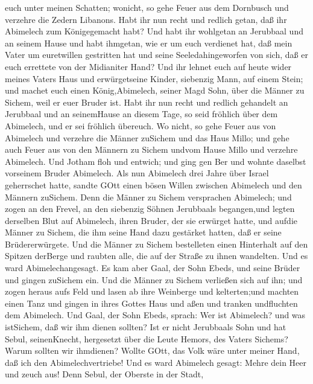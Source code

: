 euch unter meinen Schatten; wonicht, so gehe Feuer aus dem Dornbusch und
verzehre die Zedern Libanons.  Habt ihr nun recht und
redlich getan, daß ihr Abimelech zum Königegemacht habt? Und habt ihr
wohlgetan an Jerubbaal und an seinem Hause und habt ihmgetan, wie er um
euch verdienet hat,  daß mein Vater um euretwillen
gestritten hat und seine Seeledahingeworfen von sich, daß er euch
errettete von der Midianiter Hand?  Und ihr lehnet euch auf
heute wider meines Vaters Haus und erwürgetseine Kinder, siebenzig Mann,
auf einem Stein; und machet euch einen König,Abimelech, seiner Magd
Sohn, über die Männer zu Sichem, weil er euer Bruder ist. 
Habt ihr nun recht und redlich gehandelt an Jerubbaal und an seinemHause
an diesem Tage, so seid fröhlich über dem Abimelech, und er sei fröhlich
übereuch.  Wo nicht, so gehe Feuer aus von Abimelech und
verzehre die Männer zuSichem und das Haus Millo; und gehe auch Feuer aus
von den Männern zu Sichem undvom Hause Millo und verzehre Abimelech.
 Und Jotham floh und entwich; und ging gen Ber und wohnte
daselbst vorseinem Bruder Abimelech.  Als nun Abimelech
drei Jahre über Israel geherrschet hatte,  sandte GOtt
einen bösen Willen zwischen Abimelech und den Männern zuSichem. Denn die
Männer zu Sichem versprachen Abimelech;  und zogen an den
Frevel, an den siebenzig Söhnen Jerubbaals begangen,und legten derselben
Blut auf Abimelech, ihren Bruder, der sie erwürget hatte, und aufdie
Männer zu Sichem, die ihm seine Hand dazu gestärket hatten, daß er seine
Brüdererwürgete.  Und die Männer zu Sichem bestelleten
einen Hinterhalt auf den Spitzen derBerge und raubten alle, die auf der
Straße zu ihnen wandelten. Und es ward Abimelechangesagt. 
Es kam aber Gaal, der Sohn Ebeds, und seine Brüder und gingen zuSichem
ein. Und die Männer zu Sichem verließen sich auf ihn;  und
zogen heraus aufs Feld und lasen ab ihre Weinberge und kelterten;und
machten einen Tanz und gingen in ihres Gottes Haus und aßen und tranken
undfluchten dem Abimelech.  Und Gaal, der Sohn Ebeds,
sprach: Wer ist Abimelech? und was istSichem, daß wir ihm dienen
sollten? Ist er nicht Jerubbaals Sohn und hat Sebul, seinenKnecht,
hergesetzt über die Leute Hemors, des Vaters Sichems? Warum sollten wir
ihmdienen?  Wollte GOtt, das Volk wäre unter meiner Hand,
daß ich den Abimelechvertriebe! Und es ward Abimelech gesagt: Mehre dein
Heer und zeuch aus!  Denn Sebul, der Oberste in der Stadt,
